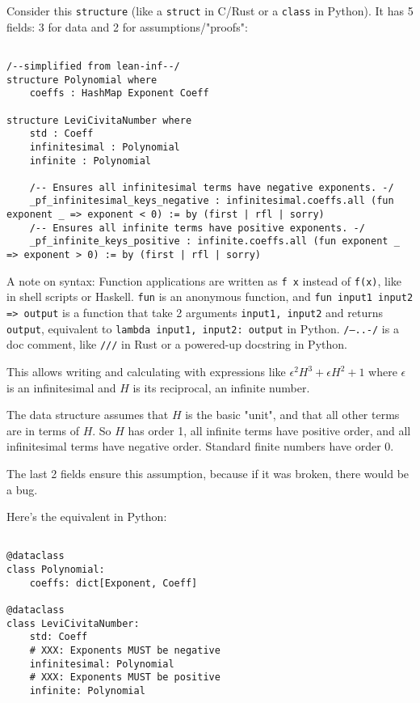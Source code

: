 \documentclass{article}
\begin{document}
Consider this \texttt{structure} (like a \texttt{struct} in C/Rust or a \texttt{class} in Python). It has 5 fields: 3 for data and 2 for assumptions/"proofs":

\begin{verbatim}

/--simplified from lean-inf--/
structure Polynomial where
    coeffs : HashMap Exponent Coeff

structure LeviCivitaNumber where
    std : Coeff
    infinitesimal : Polynomial
    infinite : Polynomial

    /-- Ensures all infinitesimal terms have negative exponents. -/
    _pf_infinitesimal_keys_negative : infinitesimal.coeffs.all (fun exponent _ => exponent < 0) := by (first | rfl | sorry)
    /-- Ensures all infinite terms have positive exponents. -/
    _pf_infinite_keys_positive : infinite.coeffs.all (fun exponent _ => exponent > 0) := by (first | rfl | sorry)
\end{verbatim}

A note on syntax: Function applications are written as \texttt{f x} instead of \texttt{f(x)}, like in shell scripts or Haskell. \texttt{fun} is an anonymous function, and \texttt{fun input1 input2 => output} is a function that take 2 arguments \texttt{input1, input2} and returns \texttt{output}, equivalent to \texttt{lambda input1, input2: output} in Python. \texttt{/--..-/} is a doc comment, like \texttt{///} in Rust or a powered-up docstring in Python.

This allows writing and calculating with expressions like $\epsilon^2 H^3 + \epsilon H^2 + 1$ where $\epsilon$ is an infinitesimal and $H$ is its reciprocal, an infinite number.

The data structure assumes that $H$ is the basic "unit", and that all other terms are in terms of $H$. So $H$ has order 1, all infinite terms have positive order, and all infinitesimal terms have negative order. Standard finite numbers have order 0.

The last 2 fields ensure this assumption, because if it was broken, there would be a bug.

Here's the equivalent in Python:

\begin{verbatim}

@dataclass
class Polynomial:
    coeffs: dict[Exponent, Coeff]

@dataclass
class LeviCivitaNumber:
    std: Coeff
    # XXX: Exponents MUST be negative
    infinitesimal: Polynomial
    # XXX: Exponents MUST be positive
    infinite: Polynomial
\end{verbatim}
\end{document}
